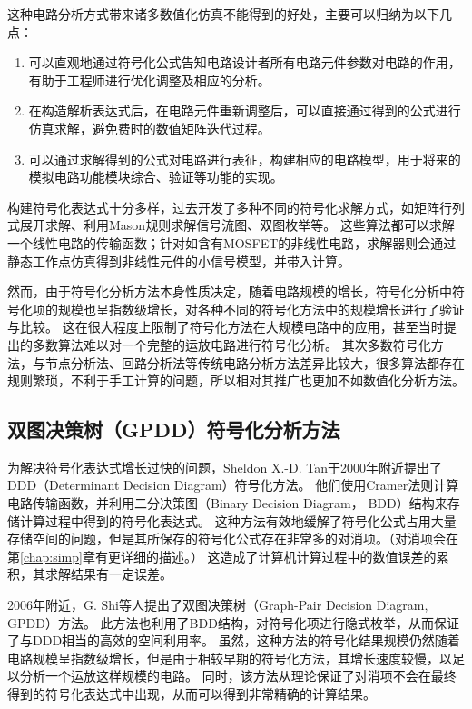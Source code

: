 这种电路分析方式带来诸多数值化仿真不能得到的好处，主要可以归纳为以下几点：

\begin{enumerate}[label=\emph{\alph*})]
	\item 可以直观地通过符号化公式告知电路设计者所有电路元件参数对电路的作用，有助于工程师进行优化调整及相应的分析。
	\item 在构造解析表达式后，在电路元件重新调整后，可以直接通过得到的公式进行仿真求解，避免费时的数值矩阵迭代过程。
	\item 可以通过求解得到的公式对电路进行表征，构建相应的电路模型，用于将来的模拟电路功能模块综合、验证等功能的实现。
\end{enumerate}

构建符号化表达式十分多样，过去开发了多种不同的符号化求解方式，如矩阵行列式展开求解\parencite{Gielen-ISAAC-1989}、利用Mason规则求解信号流图\parencite{Nebel-SFG-1995,Fino-SFG-1998}、双图枚举\parencite{Shieu-TG-1974}等。
这些算法都可以求解一个线性电路的传输函数；针对如含有MOSFET的非线性电路，求解器则会通过静态工作点仿真得到非线性元件的小信号模型，并带入计算。

然而，由于符号化分析方法本身性质决定，随着电路规模的增长，符号化分析中符号化项的规模也呈指数级增长，\parencite{Gielen-SymbSurvey-1998}对各种不同的符号化方法中的规模增长进行了验证与比较。
这在很大程度上限制了符号化方法在大规模电路中的应用，甚至当时提出的多数算法难以对一个完整的运放电路进行符号化分析。
其次多数符号化方法，与节点分析法、回路分析法等传统电路分析方法差异比较大，很多算法都存在规则繁琐，不利于手工计算的问题，所以相对其推广也更加不如数值化分析方法。

\subsection{双图决策树（GPDD）符号化分析方法}
\label{subsec:intro:symbolic:gpdd}

为解决符号化表达式增长过快的问题，Sheldon X.-D. Tan于2000年附近提出了DDD（Determinant Decision Diagram）符号化方法。
他们使用Cramer法则计算电路传输函数，并利用二分决策图（Binary Decision Diagram， BDD）结构\parencite{Bryant-BDD-1986}来存储计算过程中得到的符号化表达式\parencite{Sheldon-DDD-2000}。
这种方法有效地缓解了符号化公式占用大量存储空间的问题，但是其所保存的符号化公式存在非常多的对消项。（对消项会在第\ref{chap:simp}章有更详细的描述。）
这造成了计算机计算过程中的数值误差的累积，其求解结果有一定误差。

2006年附近，G. Shi等人提出了双图决策树（Graph-Pair Decision Diagram, GPDD）方法\parencite{ChenWeiWei-Thesis,GShi-GPDD-2013,GShi-GPDD,GShi-GPDDSurvey-2013}。
此方法也利用了BDD结构，对符号化项进行隐式枚举，从而保证了与DDD相当的高效的空间利用率。
虽然，这种方法的符号化结果规模仍然随着电路规模呈指数级增长，但是由于相较早期的符号化方法，其增长速度较慢，以足以分析一个运放这样规模的电路。
同时，该方法从理论保证了对消项不会在最终得到的符号化表达式中出现，从而可以得到非常精确的计算结果。

